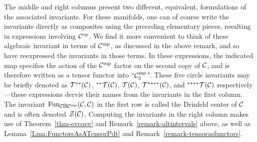 \documentclass{amsart}
\begin{document}
%
The middle and right columns present two different, equivalent, formulations of the associated invariants.  For these manifolds, one can of course write the invariants directly as composites using the preceding elementary pieces, resulting in expressions involving $\mathcal C^{\mathrm{op}}$.  We find it more convenient to think of these algebraic invariant in terms of $\mathcal C^{\mathrm{mp}}$, as discussed in the above remark, and so have reexpressed the invariants in those terms.  In these expressions, the indicated map specifies the action of the $\mathcal C^{\mathrm{mp}}$ factor on the second copy of $\mathcal C$, and is therefore written as a tensor functor into ``$\mathcal C_2^{\mathrm{mp}}$".  These five circle invariants may be briefly denoted as $\mathcal T^{**}(\mathcal C)$, ${}^{**}\mathcal T(\mathcal C)$, $\mathcal T(\mathcal C)$, $\mathcal T^{****}(\mathcal C)$, and ${}^{****}\mathcal T(\mathcal C)$ respectively---these expressions dervie their names from the invariants in the first column.  The invariant $\operatorname{Fun}_{\mathcal C \boxtimes \mathcal C^{\mathrm{mp}}}(\mathcal C,\mathcal C)$ in the first row is called the Drinfeld center of $\mathcal C$ and is often denoted $\mathcal Z(\mathcal C)$.  Computing the invariants in the right column makes use of Theorem~\ref{thm-evcoev} and Remark~\ref{remark-altintervals} above, as well as Lemma~\ref{Lma:FunctorsAsATensorPdt} and Remark~\ref{remark-tensorasfunctors}.
\end{document}
